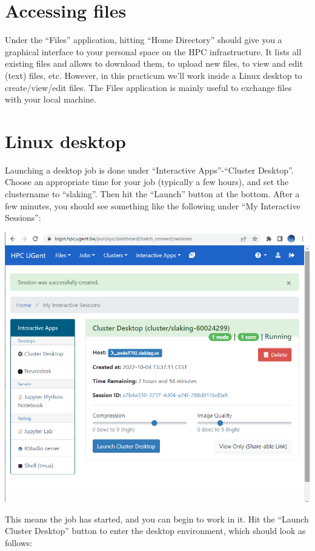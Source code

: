 \documentclass[a4paper]{article}
\begin{document}
\section{Accessing files}
%
\par
Under the ``Files'' application, hitting ``Home Directory'' should give you a graphical interface to your personal space on the HPC infrastructure. It lists all existing files and allows to download them, to upload new files, to view and edit (text) files, etc. However, in this practicum we'll work inside a Linux desktop to create/view/edit files. The Files application is mainly useful to exchange files with your local machine.
%
\section{Linux desktop}
%
\par
Launching a desktop job is done under ``Interactive Apps''-``Cluster Desktop''. Choose an appropriate time for your job (typically a few hours), and set the clustername to ``slaking''. Then hit the ``Launch'' button at the bottom. After a few minutes, you should see something like the following under ``My Interactive Sessions'':
%
\begin{center}
	\includegraphics{launch_desktop}
\end{center}
%
This means the job has started, and you can begin to work in it. Hit the ``Launch Cluster Desktop'' button to enter the desktop environment, which should look as follows:
\end{document}
